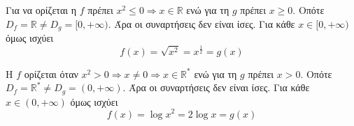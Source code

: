 \begin{alist}
\item Για να ορίζεται η $ f $ πρέπει $ x^2\leq 0\Rightarrow x\in\mathbb{R} $ ενώ για τη $ g $ πρέπει $ x\geq 0 $. Οπότε $ D_f=\mathbb{R}\neq D_g=[0,+\infty) $. Άρα οι συναρτήσεις δεν είναι ίσες. Για κάθε $ x\in[0,+\infty) $ όμως ισχύει
\[ f(x)=\sqrt{x^2}=x^{\frac{1}{2}}=g(x) \]

\item Η $ f $ ορίζεται όταν $ x^2> 0\Rightarrow x\neq 0\Rightarrow x\in\mathbb{R}^* $ ενώ για τη $ g $ πρέπει $ x>0 $. Οπότε $ D_f=\mathbb{R}^*\neq D_g=(0,+\infty) $. Άρα οι συναρτήσεις δεν είναι ίσες. Για κάθε $ x\in(0,+\infty) $ όμως ισχύει
\[ f(x)=\log{x^2}=2\log{x}=g(x) \]
\end{alist}
